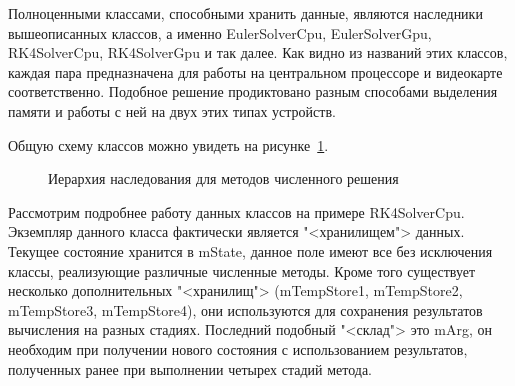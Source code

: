 \documentclass[a4paper, 14pt]{extarticle}
\theoremstyle{definition}
\begin{document}
\par Полноценными классами, способными хранить данные, являются наследники вышеописанных классов, а именно EulerSolverCpu, EulerSolverGpu, RK4SolverCpu, RK4SolverGpu и так далее. Как видно из названий этих классов, каждая пара предназначена для работы на центральном процессоре и видеокарте соответственно. Подобное решение продиктовано разным способами выделения памяти и работы с ней на двух этих типах устройств.

\par Общую схему классов можно увидеть на рисунке~\ref{ris:solvers}.

\begin{figure}[h]
	\caption{Иерархия наследования для методов численного решения}
	\label{ris:solvers}
\end{figure}

\par Рассмотрим подробнее работу данных классов на примере RK4SolverCpu. Экземпляр данного класса фактически является "<хранилищем"> данных. Текущее состояние хранится в mState, данное поле имеют все без исключения классы, реализующие различные численные методы. Кроме того существует несколько дополнительных "<хранилищ"> (mTempStore1, mTempStore2, mTempStore3, mTempStore4), они используются для сохранения результатов вычисления на разных стадиях. Последний подобный "<склад">  это mArg, он необходим при получении нового состояния с использованием результатов, полученных ранее при выполнении четырех стадий метода.
\end{document}
